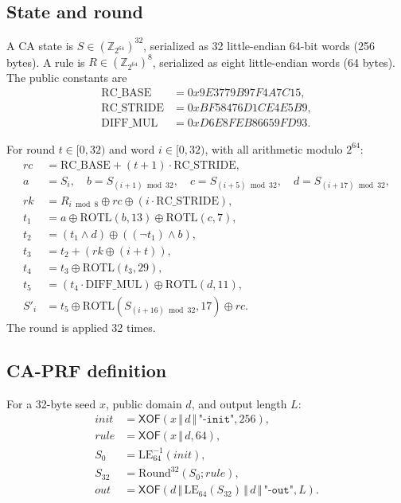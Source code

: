 \documentclass[runningheads]{llncs}
\newcommand{\concat}{\,\Vert\,}
\newcommand{\Z}{\mathbb{Z}}
\newcommand{\XOF}{\mathsf{XOF}}
\begin{document}
\subsection{State and round}

\begin{definition}
A CA state is $S\in(\Z_{2^{64}})^{32}$, serialized as 32 little-endian
64-bit words (256 bytes).  A rule is $R\in(\Z_{2^{64}})^8$, serialized
as eight little-endian words (64 bytes).  The public constants are
\[
\begin{aligned}
 \mathrm{RC\_BASE}&=0x9E3779B97F4A7C15,\\
 \mathrm{RC\_STRIDE}&=0xBF58476D1CE4E5B9,\\
 \mathrm{DIFF\_MUL}&=0xD6E8FEB86659FD93.
\end{aligned}
\]
\end{definition}

\begin{definition}[CA round]
For round $t\in[0,32)$ and word $i\in[0,32)$, with all arithmetic
modulo $2^{64}$:
\[
\begin{aligned}
 rc &= \mathrm{RC\_BASE}+(t+1)\cdot\mathrm{RC\_STRIDE},\\
 a &= S_i,\quad b=S_{(i+1)\bmod32},\quad
 c=S_{(i+5)\bmod32},\quad d=S_{(i+17)\bmod32},\\
 rk &= R_{i\bmod8}\oplus rc\oplus(i\cdot\mathrm{RC\_STRIDE}),\\
 t_1 &= a\oplus\mathrm{ROTL}(b,13)\oplus\mathrm{ROTL}(c,7),\\
 t_2 &= (t_1\land d)\oplus((\lnot t_1)\land b),\\
 t_3 &= t_2+(rk\oplus(i+t)),\\
 t_4 &= t_3\oplus\mathrm{ROTL}(t_3,29),\\
 t_5 &= (t_4\cdot\mathrm{DIFF\_MUL})\oplus\mathrm{ROTL}(d,11),\\
 S'_i &= t_5\oplus\mathrm{ROTL}(S_{(i+16)\bmod32},17)\oplus rc.
\end{aligned}
\]
The round is applied 32 times.
\end{definition}

\subsection{CA-PRF definition}

\begin{definition}[CA-PRF]
For a 32-byte seed $x$, public domain $d$, and output length $L$:
\[
\begin{aligned}
 \mathit{init} &= \XOF(x\concat d\concat\texttt{"-init"},256),\\
 \mathit{rule} &= \XOF(x\concat d,64),\\
 S_0 &= \mathrm{LE}^{-1}_{64}(\mathit{init}),\\
 S_{32} &= \mathrm{Round}^{32}(S_0;\mathit{rule}),\\
 \mathit{out} &= \XOF(d\concat\mathrm{LE}_{64}(S_{32})
   \concat d\concat\texttt{"-out"},L).
\end{aligned}
\]
\end{definition}
\end{document}
